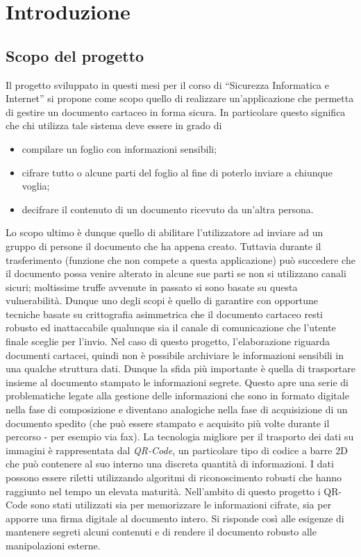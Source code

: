\def \ti{\textit}
\def \bf{\textbf}

\chapter{Introduzione}
	\label{cap:intro}
	
\section{Scopo del progetto}
	\label{sec:scopo}

Il progetto sviluppato in questi mesi per il corso di ``Sicurezza Informatica e Internet'' si propone come scopo quello di realizzare un'applicazione che permetta di gestire un documento cartaceo in forma sicura.
In particolare questo significa che chi utilizza tale sistema deve essere in grado di
\begin{itemize}
	\item compilare un foglio con informazioni sensibili;
	\item cifrare tutto o alcune parti del foglio al fine di poterlo inviare a chiunque voglia;
	\item decifrare il contenuto di un documento ricevuto da un'altra persona.
\end{itemize}
Lo scopo ultimo è dunque quello di abilitare l'utilizzatore ad inviare ad un gruppo di persone il documento che ha appena creato. Tuttavia durante il trasferimento (funzione che non compete a questa applicazione) può succedere che il documento possa venire alterato in alcune sue parti se non si utilizzano canali sicuri; moltissime truffe avvenute in passato si sono basate su questa vulnerabilità. Dunque uno degli scopi è quello di garantire con opportune tecniche basate su crittografia asimmetrica che il documento cartaceo resti robusto ed inattaccabile qualunque sia il canale di comunicazione che l'utente finale sceglie per l'invio.
Nel caso di questo progetto, l'elaborazione riguarda documenti cartacei, quindi non è possibile archiviare le informazioni sensibili in una qualche struttura dati. Dunque la sfida più importante è quella di trasportare insieme al documento stampato le informazioni segrete.
Questo apre una serie di problematiche legate alla gestione delle informazioni che sono in formato digitale nella fase di composizione e diventano analogiche nella fase di acquisizione di un documento spedito (che può essere stampato e acquisito più volte durante il percorso - per esempio via fax).
La tecnologia migliore per il trasporto dei dati su immagini è rappresentata dal \emph{QR-Code}, un particolare tipo di codice a barre 2D che può contenere al suo interno una discreta quantità di informazioni.
I dati possono essere riletti utilizzando algoritmi di riconoscimento robusti che hanno raggiunto nel tempo un elevata maturità.
Nell'ambito di questo progetto i QR-Code sono stati utilizzati sia per memorizzare le informazioni cifrate, sia per apporre una firma digitale al documento intero. Si risponde così alle esigenze di mantenere segreti alcuni contenuti e di rendere il documento robusto alle manipolazioni esterne.

